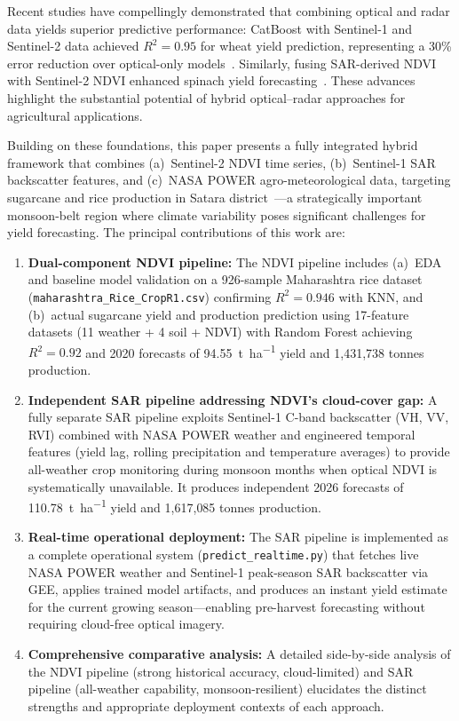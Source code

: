 \documentclass[conference]{IEEEtran}
\begin{document}
Recent studies have compellingly demonstrated that combining optical and radar
data yields superior predictive performance: CatBoost with Sentinel-1 and
Sentinel-2 data achieved $R^2 = 0.95$ for wheat yield prediction, representing
a 30\% error reduction over optical-only models~\cite{uribe2023}. Similarly,
fusing SAR-derived NDVI with Sentinel-2 NDVI enhanced spinach yield
forecasting~\cite{mesas2023}. These advances highlight the substantial
potential of hybrid optical--radar approaches for agricultural applications.

Building on these foundations, this paper presents a fully integrated hybrid
framework that combines (a)~Sentinel-2 NDVI time series, (b)~Sentinel-1 SAR
backscatter features, and (c)~NASA POWER agro-meteorological data, targeting
sugarcane and rice production in Satara district~\cite{karande2016}---a
strategically important monsoon-belt region where climate variability poses
significant challenges for yield forecasting. The principal contributions of
this work are:

\begin{enumerate}[leftmargin=*]
  \item \textbf{Dual-component NDVI pipeline:} The NDVI pipeline includes
    (a)~EDA and baseline model validation on a 926-sample Maharashtra rice
    dataset (\texttt{maharashtra\_Rice\_CropR1.csv}) confirming $R^2 = 0.946$
    with KNN, and (b)~actual sugarcane yield and production prediction using
    17-feature datasets (11 weather + 4 soil + NDVI) with Random Forest
    achieving $R^2 = 0.92$ and 2020 forecasts of \SI{94.55}{\tonne\per\hectare}
    yield and 1{,}431{,}738 tonnes production.
  \item \textbf{Independent SAR pipeline addressing NDVI's cloud-cover gap:}
    A fully separate SAR pipeline exploits Sentinel-1 C-band backscatter (VH,
    VV, RVI) combined with NASA POWER weather and engineered temporal features
    (yield lag, rolling precipitation and temperature averages) to provide
    all-weather crop monitoring during monsoon months when optical NDVI is
    systematically unavailable. It produces independent 2026 forecasts of
    \SI{110.78}{\tonne\per\hectare} yield and 1{,}617{,}085 tonnes production.
  \item \textbf{Real-time operational deployment:} The SAR pipeline is
    implemented as a complete operational system (\texttt{predict\_realtime.py})
    that fetches live NASA POWER weather and Sentinel-1 peak-season SAR
    backscatter via GEE, applies trained model artifacts, and produces an
    instant yield estimate for the current growing season---enabling
    pre-harvest forecasting without requiring cloud-free optical imagery.
  \item \textbf{Comprehensive comparative analysis:} A detailed side-by-side
    analysis of the NDVI pipeline (strong historical accuracy, cloud-limited)
    and SAR pipeline (all-weather capability, monsoon-resilient) elucidates
    the distinct strengths and appropriate deployment contexts of each approach.
\end{enumerate}
\end{document}
